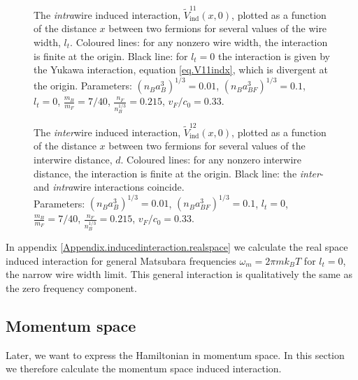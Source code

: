 \begin{figure} 
\begin{center}
  
\caption{The \textit{intra}wire induced interaction, $\tilde{V}^{11}_{\text{ind}}(x, 0)$, plotted as a function of the distance $x$ between two fermions for several values of the wire width, $l_t$. Coloured lines: for any nonzero wire width, the interaction is finite at the origin. Black line: for $l_t = 0$ the interaction is given by the Yukawa interaction, equation \eqref{eq.V11indx}, which is divergent at the origin. Parameters: $(n_Ba_B^3)^{1/3} = 0.01$, $(n_Ba_{BF}^3)^{1/3} = 0.1$, $l_t = 0$, $\frac{m_B}{m_F} = 7/40$, $\frac{n_F}{n_B^{1/3}} = 0.215$, $v_F/c_0 = 0.33$.}
\label{fig.V11indx}   
\vspace{0.5cm}
  
\caption{The \textit{inter}wire induced interaction, $\tilde{V}^{12}_{\text{ind}}(x, 0)$, plotted as a function of the distance $x$ between two fermions for several values of the interwire distance, $d$. Coloured lines: for any nonzero interwire distance, the interaction is finite at the origin. Black line: the \textit{inter}- and \textit{intra}wire interactions coincide. \\ Parameters: $(n_Ba_B^3)^{1/3} = 0.01$, $(n_Ba_{BF}^3)^{1/3} = 0.1$, $l_t = 0$, $\frac{m_B}{m_F} = 7/40$, $\frac{n_F}{n_B^{1/3}} = 0.215$, $v_F/c_0 = 0.33$.}  
\label{fig.V12indx}  
\end{center}    
\end{figure}

In appendix \ref{Appendix.inducedinteraction.realspace} we calculate the real space induced interaction for general Matsubara frequencies $\omega_m = 2\pi m k_BT$ for $l_t = 0$, the narrow wire width limit. This general interaction is qualitatively the same as the zero frequency component.  

\subsection{Momentum space}
\label{subsec.inducedinteraction.momentumspace}
Later, we want to express the Hamiltonian in momentum space. In this section we therefore calculate the momentum space induced interaction. 

